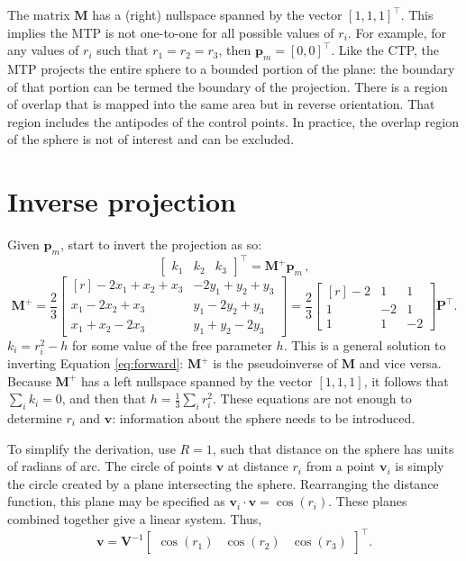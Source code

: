 \documentclass[]{interact}
\begin{document}
The matrix $\mathbf M$ has a (right) nullspace spanned by the vector
$[1, 1, 1]^\top$. This implies the MTP is not one-to-one for all possible values
of $r_i$. For example, for any values of $r_i$ such that $r_1 = r_2 = r_3$, then
$\mathbf p_m = [0, 0]^\top$. Like the CTP, the MTP projects the entire sphere to
a bounded portion of the plane: the boundary of that portion can be termed the
boundary of the projection. There is a region of overlap that is mapped into
the same area but in reverse orientation.
That region includes the antipodes of the control points. In practice,
the overlap region of the sphere is not of interest and can be excluded.

\section{Inverse projection}
Given $\mathbf p_m$, start to invert the projection as so:
\begin{equation}\label{eq:inverse}
\begin{bmatrix*} k_1 & k_2 & k_3
\end{bmatrix*}^\top = \mathbf M^+ \mathbf p_m \,,
\end{equation}
\begin{equation}\label{eq:inversem}
\mathbf M^+ = \frac{2}{3}
\begin{bmatrix*}[r] -2x_1 + x_2 + x_3 & -2y_1 + y_2 + y_3 \\
x_1 - 2x_2 + x_3 & y_1 - 2y_2 + y_3 \\
x_1 + x_2 - 2x_3 & y_1 + y_2 - 2y_3
\end{bmatrix*} = \frac{2}{3}
\begin{bmatrix*}[r] -2 & 1 & 1 \\
1 & -2 & 1 \\
1 & 1 & -2
\end{bmatrix*}
\mathbf P^\top .
\end{equation}
$k_i = r^2_i - h$ for some value of the free parameter $h$. This is a general
solution to inverting Equation \ref{eq:forward}: $\mathbf M^+$ is the
pseudoinverse of $\mathbf M$ and vice versa. Because $\mathbf M^+$ has a left
nullspace spanned by the vector $[1, 1, 1]$, it follows that $\sum_i k_i = 0$,
and then that $h = \frac{1}{3}\sum_i r^2_i$.
These equations are not enough to determine $r_i$ and $\mathbf v$:
information about the sphere needs to be introduced.

To simplify the derivation, use $R=1$, such that distance on the
sphere has units of radians of arc. The circle of points $\mathbf v$ at
distance $r_i$ from a point $\mathbf v_i$ is simply the circle created by a
plane intersecting the sphere. Rearranging the distance function, this plane
may be specified as $\mathbf v_i \cdot \mathbf v = \cos\left(r_i\right).$
These planes combined together give a linear system. Thus,
\begin{equation}\label{eq:inversev}
  \mathbf v = \mathbf V^{-1} \begin{bmatrix*} \cos\left(r_1\right) &
  \cos\left(r_2\right) &
  \cos\left(r_3\right)
  \end{bmatrix*}^\top .
\end{equation}
\end{document}
